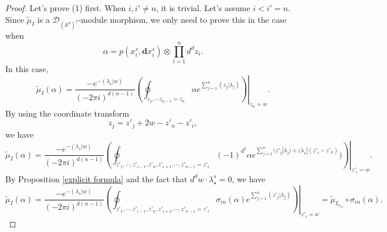 \documentclass[11pt]{amsart}
\theoremstyle{definition}
\theoremstyle{remark}
\numberwithin{equation}{section}
\begin{document}
\begin{proof}
    Let's prove (1) first. When $i,i'\neq n$, it is trivial. Let's assume $i<i'=n$. Since $\tilde{\mu}_{ I}$ is a $\mathcal{D}_{(\mathbb{A}^{d})^{ I}}$-module morphism, we only need to prove this in the case when
    $$
    \alpha=p(x_{i}^{s},\mathbf{d}x_{i}^{s})\otimes\prod_{i=1}^{n}d^{d}z_{i}.
    $$
    In this case,
    $$
    \tilde{\mu}_{ I}(\alpha)=\frac{-e^{-(\lambda_{\star}| w)}}{(-2\pi i)^{d(n-1)}}\left.\left(\oint_{z_{1},\cdots z_{n-1}=z_{n}}\alpha e^{\sum\limits_{j=1}^{n}(z_{j}|\lambda_{j})}\right)\right|_{z_{n}=w}.
    $$
    By using the coordinate transform
    $$
    z_{j}=z'_{j}+2w-z'_{n}-z'_{i},
    $$
    we have
    $$
    \tilde{\mu}_{ I}(\alpha)=\frac{-e^{-(\lambda_{\star}| w)}}{(-2\pi i)^{d(n-1)}}\left.\left(\oint_{z'_{1},\cdots, z'_{i-1},z'_{n}, z'_{i+1},\cdots, z'_{n-1}=z'_{i}}(-1)^{d^2}\alpha e^{\sum\limits_{j=1}^{n}(z'_{j}|\lambda_{j})+(\lambda_{\star}|(z'_i-z'_n)})\right)\right|_{z'_{i}=w}.
    $$
    By Proposition \ref{explicit formula} and the fact that $d^{d}w\cdot\lambda_{\star}^{s}=0$, we have
    $$
    \tilde{\mu}_{ I}(\alpha)=\frac{-e^{-(\lambda_{\star}| w)}}{(-2\pi i)^{d(n-1)}}\left.\left(\oint_{z'_{1},\cdots, z'_{i-1},z'_{n}, z'_{i+1},\cdots, z'_{n-1}=z'_{i}}{\sigma_{in}}(\alpha) e^{\sum\limits_{j=1}^{n}(z'_{j}| \lambda_{j})}\right)\right|_{z'_{i}=w}=\tilde{\mu}_{ I_{\sigma_{in}}}\circ{\sigma_{in}}(\alpha).
    $$


\end{proof}
\end{document}

